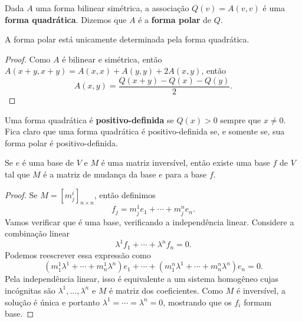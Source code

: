 Dada $A$ uma forma bilinear simétrica, a associação $Q(v) = A(v,v)$ é uma \textbf{forma quadrática}. Dizemos que $A$ é a \textbf{forma polar} de $Q$.

\begin{proposition}
    A forma polar está unicamente determinada pela forma quadrática.
\end{proposition}
\begin{proof}
    Como $A$ é bilinear e simétrica, então $A(x + y, x + y) = A(x,x) + A(y,y) + 2A(x,y)$, então \begin{equation}
        A(x,y) = \frac{Q(x+y) - Q(x) - Q(y)}{2}.
    \end{equation}
\end{proof}

Uma forma quadrática é \textbf{positivo-definida} se $Q(x) > 0$ sempre que $x \neq 0$. Fica claro que uma forma quadrática é positivo-definida se, e somente se, sua forma polar é positivo-definida.

\begin{proposition}
    Se $e$ é uma base de $V$ e $M$ é uma matriz inversível, então existe uma base $f$ de $V$ tal que $M$ é a matriz de mudança da base $e$ para a base $f$.
\end{proposition}
\begin{proof}
    Se $M = [m^i_j]_{n \times n}$, então definimos \begin{equation}
        f_j = m^1_j e_1 + \cdots + m^n_j e_n.
    \end{equation} Vamos verificar que é uma base, verificando a independência linear. Considere a combinação linear \begin{equation}
        \lambda^1 f_1 + \cdots + \lambda^n f_n = 0.
    \end{equation} Podemos reescrever essa expressão como \begin{equation}
        (m^1_1 \lambda^1 + \cdots + m^1_n \lambda^n) e_1 + \cdots + (m^n_1 \lambda^1 + \cdots + m^n_n \lambda^n) e_n = 0.
    \end{equation} Pela independência linear, isso é equivalente a um sistema homogêneo cujas incógnitas são $\lambda^1, \dots, \lambda^n$ e $M$ é matriz dos coeficientes. Como $M$ é inversível, a solução é única e portanto $\lambda^1 = \cdots = \lambda^n = 0$, mostrando que os $f_i$ formam base.
\end{proof}

